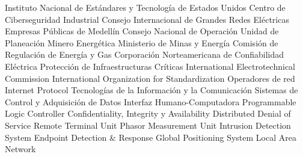 \usepackage[acronym]{glossaries}
\makeglossaries


 {Instituto Nacional de Estándares y Tecnología de Estados Unidos}
 {Centro de Ciberseguridad Industrial}
 {Consejo Internacional de Grandes Redes Eléctricas}
 {Empresas Públicas de Medellín}
 {Consejo Nacional de Operación}
 {Unidad de Planeación Minero Energética}
 {Ministerio de Minas y Energía}
 {Comisión de Regulación de Energía y Gas}
 {Corporación Norteamericana de Confiabilidad Eléctrica}
 {Protección de Infraestructuras Críticas}
 {International Electrotechnical Commission}
 {International Organization for Standardization}
 {Operadores de red}
 {Internet Protocol}
 {Tecnologías de la Información y la Comunicación}
 {Sistemas de Control y Adquisición de Datos}
 {Interfaz Humano-Computadora}
 {Programmable Logic Controller}
 {Confidentiality, Integrity y Availability}
 {Distributed Denial of Service}
 {Remote Terminal Unit}
 {Phasor Measurement Unit}
 {Intrusion Detection System}
 {Endpoint Detection \& Response}
 {Global Positioning System}
 {Local Area Network}
